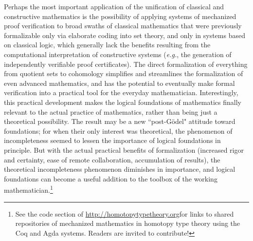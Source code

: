 \documentclass[11pt]{article}
\theoremstyle{remark}
\theoremstyle{definition}
\begin{document}
Perhaps the most important application of the unification of classical and constructive mathematics is the possibility
of applying systems of mechanized proof verification to broad swaths of classical mathematics that were previously
formalizable only via elaborate coding into set theory, and only in systems based on classical logic, which generally
lack the benefits resulting from the computational interpretation of constructive systems (\textit{e.g.}, the generation
of independently verifiable proof certificates).  The direct formalization of everything from quotient sets to
cohomology simplifies and streamlines the formalization of even advanced mathematics, and has the potential to
eventually make formal verification into a practical tool for the everyday mathematician.  Interestingly, this practical
development makes the logical foundations of mathematics finally relevant to the actual practice of mathematics, rather
than being just a theoretical possibility.  The result may be a new ``post-G\"odel" attitude toward foundations; for
when their only interest was theoretical, the phenomenon of incompleteness seemed to lessen the importance of logical
foundations in principle.  But with the actual practical benefits of formalization (increased rigor and certainty, ease
of remote collaboration, accumulation of results), the theoretical incompleteness phenomenon diminishes in importance,
and logical foundations can become a useful addition to the toolbox of the working mathematician.\footnote{See the code
  section of \url{http://homotopytypetheory.org}for links to shared repositories of mechanized mathematics in homotopy
  type theory using the Coq and Agda systems.  Readers are invited to contribute!}

\end{document}
